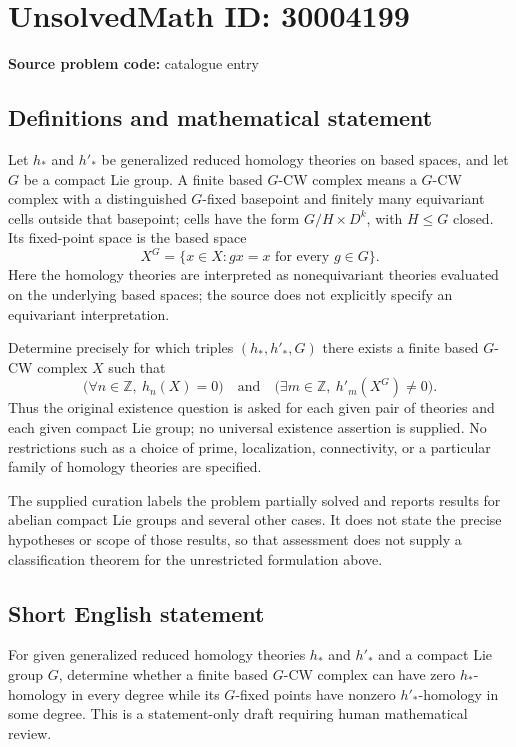 \documentclass[11pt]{article}
\newcommand{\Z}{\mathbb{Z}}
\begin{document}
\section*{UnsolvedMath ID: 30004199}
\textbf{Source problem code:} catalogue entry
\subsection{Definitions and mathematical statement}
Let \(h_*\) and \(h'_*\) be generalized reduced homology theories on based spaces, and let \(G\) be a compact Lie group. A finite based \(G\)-CW complex means a \(G\)-CW complex with a distinguished \(G\)-fixed basepoint and finitely many equivariant cells outside that basepoint; cells have the form \(G/H\times D^k\), with \(H\leq G\) closed. Its fixed-point space is the based space
\[
X^G=\{x\in X:gx=x\text{ for every }g\in G\}.
\]
Here the homology theories are interpreted as nonequivariant theories evaluated on the underlying based spaces; the source does not explicitly specify an equivariant interpretation.

Determine precisely for which triples \((h_*,h'_*,G)\) there exists a finite based \(G\)-CW complex \(X\) such that
\[
\bigl(\forall n\in\Z,\ h_n(X)=0\bigr)
\quad\text{and}\quad
\bigl(\exists m\in\Z,\ h'_m(X^G)\neq 0\bigr).
\]
Thus the original existence question is asked for each given pair of theories and each given compact Lie group; no universal existence assertion is supplied. No restrictions such as a choice of prime, localization, connectivity, or a particular family of homology theories are specified.

The supplied curation labels the problem partially solved and reports results for abelian compact Lie groups and several other cases. It does not state the precise hypotheses or scope of those results, so that assessment does not supply a classification theorem for the unrestricted formulation above.
\subsection{Short English statement}
For given generalized reduced homology theories \(h_*\) and \(h'_*\) and a compact Lie group \(G\), determine whether a finite based \(G\)-CW complex can have zero \(h_*\)-homology in every degree while its \(G\)-fixed points have nonzero \(h'_*\)-homology in some degree. This is a statement-only draft requiring human mathematical review.
\end{document}
